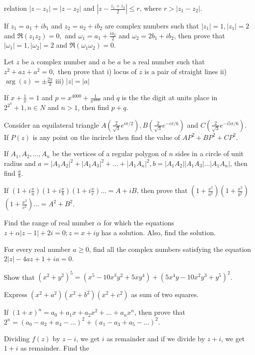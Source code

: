   relation $|z - z_1| = |z - z_2|$ and $\left|z - \frac{z_1 + z_2}{2}\right|\leq r$, where $r > |z_1 - z_2|$.
\item If $z_1 = a_1 + ib_1$ and $z_2 = a_2 + ib_2$ are complex numbers such that $|z_1| = 1, |z_1| = 2$ and $\Re(z_1z_2) =
  0,$ and $\omega_1 = a_1 + \frac{ia_2}{2}$ and $\omega_2 = 2b_1 + ib_2$, then prove that $|\omega_1| = 1, |\omega_2| = 2$ and
  $\Re(\omega_1\omega_2) = 0$.
\item Let $z$ be a complex number and $a$ be $a$ be a real number such that $z^2 + az + a^2 = 0,$ then prove that i)
  locus of $z$ is a pair of straight lines ii) $\arg(z) = \pm\frac{2\pi}{3}$ iii) $|z| = |a|$
\item If $x + \frac{1}{x} = 1$ and $p = x^{4000} + \frac{1}{x^{4000}}$ and $q$ is the the digit at units place in
  $2^{2^n} + 1, n\in N$ and $n > 1$, then find $p + q$.
\item Consider an equilateral triangle $A\left(\frac{2}{\sqrt{3}}e^{i\pi/2}\right),
  B\left(\frac{2}{\sqrt{3}}e^{-i\pi/6}\right)$ and $C\left(\frac{2}{\sqrt{3}}e^{-i5\pi/6}\right)$. If $P(z)$ is any point on the
  incircle then find the value of $AP^2 + BP^2 + CP^2$.
\item If $A_1, A_2, \ldots, A_n$ be the vertices of a regular polygon of $n$ sides in a circle of unit radius and $a =
  |A_1A_2|^2 + |A_1A_3|^2 + \ldots + |A_1A_n|^2, b = |A_1A_2||A_1A_3|\ldots |A_1A_n|$, then find $\frac{a}{b}$.
\item If $\left(1 + i\frac{x}{a}\right)\left(1+ i\frac{x}{b}\right)\left(1 + i\frac{x}{c}\right)\ldots = A + iB$, then
  prove that $\left(1 + \frac{x^2}{a^2}\right)\left(1 + \frac{x^2}{b^2}\right)$
  $\left(1 + \frac{x^2}{c^2}\right) \ldots = A^2 + B^2$.
\item Find the range of real number $\alpha$ for which the equations $z+\alpha|z-1|+2i=0;z=x+iy$ has a solution. Also,
  find the solution.
\item For every real number $a\geq0$, find all the complex numbers satisfying the equation $2|z| - 4az+1+ia=0$.
\item Show that $(x^2 + y^2)^5 = (x^5 - 10x^3y^2 + 5xy^4) + (5x^4y - 10x^2y^3 + y^5)^2$.
\item Express $(x^2+a^2)(x^2+b^2)(x^2+c^2)$ as sum of two squares.
\item If $(1 + x)^n = a_0 + a_1x + a_2x^2 + \ldots + a_nx^n$, then prove that $2^n = (a_0 - a_2 + a_4 - \ldots)^2 + (a_1
  - a_3 + a_5 - \ldots)^2$.
\item Dividing $f(z)$ by $z -i$, we get $i$ as remainder and if we divide by $z+i$, we get $1+i$ as remainder. Find the
